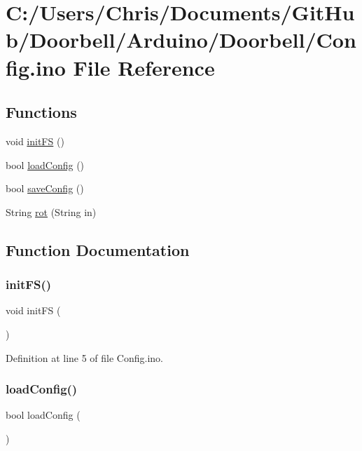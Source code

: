 \hypertarget{_config_8ino}{}\section{C\+:/\+Users/\+Chris/\+Documents/\+Git\+Hub/\+Doorbell/\+Arduino/\+Doorbell/\+Config.ino File Reference}
\label{_config_8ino}
\subsection*{Functions}
\begin{DoxyCompactItemize}
\item 
void \mbox{\hyperlink{_config_8ino_a71502ea2a2f3c2ba9d3caaeb1655c997}{init\+FS}} ()
\item 
bool \mbox{\hyperlink{_config_8ino_a391c03491ec82959f142de94af1ff7a2}{load\+Config}} ()
\item 
bool \mbox{\hyperlink{_config_8ino_a185d7f2d6e216d095034529d9e9d6776}{save\+Config}} ()
\item 
String \mbox{\hyperlink{_config_8ino_a531e35e139960a373d7880a09a0c41ec}{rot}} (String in)
\end{DoxyCompactItemize}


\subsection{Function Documentation}
\mbox{\label{_config_8ino_a71502ea2a2f3c2ba9d3caaeb1655c997}} 
\subsubsection{\texorpdfstring{initFS()}{initFS()}}
{\footnotesize\ttfamily void init\+FS (\begin{DoxyParamCaption}{ }\end{DoxyParamCaption})}



Definition at line 5 of file Config.\+ino.

\mbox{\label{_config_8ino_a391c03491ec82959f142de94af1ff7a2}} 
\subsubsection{\texorpdfstring{loadConfig()}{loadConfig()}}
{\footnotesize\ttfamily bool load\+Config (\begin{DoxyParamCaption}{ }\end{DoxyParamCaption})}



